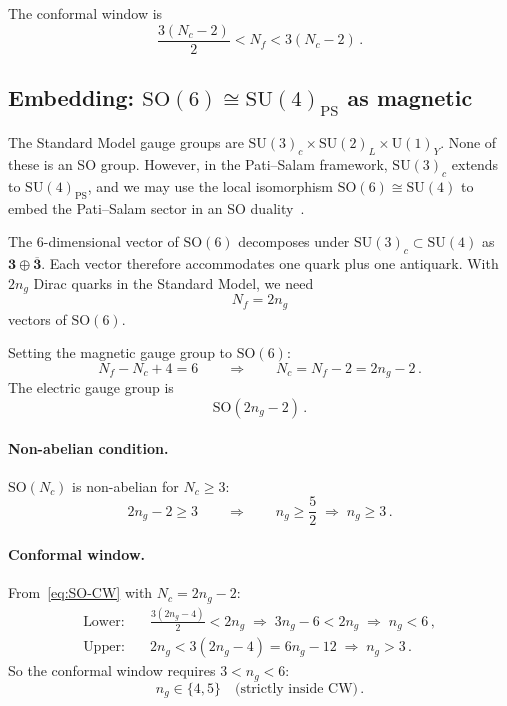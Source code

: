 \documentclass[11pt,a4paper]{article}
\theoremstyle{plain}
\theoremstyle{definition}
\theoremstyle{remark}
\newcommand{\Nc}{N_{\!c}}
\newcommand{\Nf}{N_{\!f}}
\newcommand{\ngen}{n_g}
\newcommand{\SU}[1]{\mathrm{SU}(#1)}
\newcommand{\UU}[1]{\mathrm{U}(#1)}
\newcommand{\SO}[1]{\mathrm{SO}(#1)}
\begin{document}
The conformal window is
\begin{equation}\label{eq:SO-CW}
  \frac{3(\Nc - 2)}{2} < \Nf < 3(\Nc - 2)\,.
\end{equation}

\subsection{Embedding: $\SO{6} \cong \SU{4}_{\mathrm{PS}}$ as magnetic}

The Standard Model gauge groups are $\SU{3}_c \times \SU{2}_L
\times \UU{1}_Y$.  None of these is an SO group.  However, in the
Pati--Salam framework, $\SU{3}_c$ extends to $\SU{4}_{\mathrm{PS}}$,
and we may use the local isomorphism
$\SO{6} \cong \SU{4}$ to embed the Pati--Salam sector in an SO
duality~\cite{IS9506101,PS1974}.

The 6-dimensional vector of $\SO{6}$ decomposes under
$\SU{3}_c \subset \SU{4}$ as $\mathbf{3} \oplus \overline{\mathbf{3}}$.
Each vector therefore accommodates one quark plus one antiquark.  With
$2\ngen$ Dirac quarks in the Standard Model, we need
\begin{equation}
  \Nf = 2\ngen
\end{equation}
vectors of $\SO{6}$.

Setting the magnetic gauge group to $\SO{6}$:
\begin{equation}
  \Nf - \Nc + 4 = 6
  \qquad\Longrightarrow\qquad
  \Nc = \Nf - 2 = 2\ngen - 2\,.
\end{equation}
The electric gauge group is
\begin{equation}\label{eq:SO-electric}
  \boxed{\SO{2\ngen - 2}}\,.
\end{equation}

\paragraph{Non-abelian condition.}
$\SO{\Nc}$ is non-abelian for $\Nc \geq 3$:
\begin{equation}\label{eq:SO-bound}
  2\ngen - 2 \geq 3
  \qquad\Longrightarrow\qquad
  \boxed{\ngen \geq \frac{5}{2} \;\Longrightarrow\; \ngen \geq 3}\,.
\end{equation}

\paragraph{Conformal window.}
From~\eqref{eq:SO-CW} with $\Nc = 2\ngen - 2$:
\begin{align}
  \text{Lower:}&\quad \frac{3(2\ngen - 4)}{2} < 2\ngen
  \;\Longrightarrow\;
  3\ngen - 6 < 2\ngen
  \;\Longrightarrow\;
  \ngen < 6\,,
  \label{eq:SO-CW-lower} \\
  \text{Upper:}&\quad 2\ngen < 3(2\ngen - 4) = 6\ngen - 12
  \;\Longrightarrow\;
  \ngen > 3\,.
  \label{eq:SO-CW-upper}
\end{align}
So the conformal window requires $3 < \ngen < 6$:
\begin{equation}\label{eq:SO-CW-ng}
  \ngen \in \{4, 5\} \quad\text{(strictly inside CW)}\,.
\end{equation}
\end{document}
